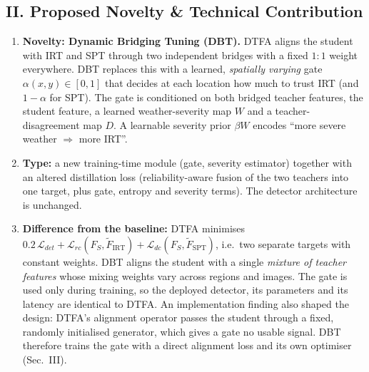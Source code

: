 \documentclass[8pt,a4paper]{article}
\newcommand{\FI}{\tilde{F}_{\mathrm{IRT}}}
\newcommand{\FP}{\tilde{F}_{\mathrm{SPT}}}
\newcommand{\FS}{F_{S}}
\begin{document}
\subsection*{II. Proposed Novelty \& Technical Contribution}
\begin{enumerate}
    \item \textbf{Novelty: Dynamic Bridging Tuning (DBT).} DTFA aligns the student with IRT and SPT through two independent bridges with a fixed $1{:}1$ weight everywhere. DBT replaces this with a learned, \emph{spatially varying} gate $\alpha(x,y)\in[0,1]$ that decides at each location how much to trust IRT (and $1-\alpha$ for SPT). The gate is conditioned on both bridged teacher features, the student feature, a learned weather-severity map $W$ and a teacher-disagreement map $D$. A learnable severity prior $\beta W$ encodes ``more severe weather $\Rightarrow$ more IRT''.
    \item \textbf{Type:} a new training-time module (gate, severity estimator) together with an altered distillation loss (reliability-aware fusion of the two teachers into one target, plus gate, entropy and severity terms). The detector architecture is unchanged.
    \item \textbf{Difference from the baseline:} DTFA minimises $0.2\,\mathcal{L}_{det}+\mathcal{L}_{rc}(\FS,\FI)+\mathcal{L}_{dc}(\FS,\FP)$, i.e.\ two separate targets with constant weights. DBT aligns the student with a single \emph{mixture of teacher features} whose mixing weights vary across regions and images. The gate is used only during training, so the deployed detector, its parameters and its latency are identical to DTFA. An implementation finding also shaped the design: DTFA's alignment operator passes the student through a fixed, randomly initialised generator, which gives a gate no usable signal. DBT therefore trains the gate with a direct alignment loss and its own optimiser (Sec.~III).
\end{enumerate}

\end{document}
